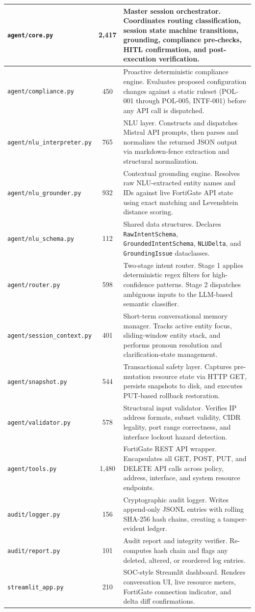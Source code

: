 \begin{longtable}{|l|c|p{7.5cm}|}
\texttt{agent/core.py} & 2,417 & Master session orchestrator. Coordinates routing classification, session state machine transitions, grounding, compliance pre-checks, HITL confirmation, and post-execution verification. \\ \hline
\texttt{agent/compliance.py} & 450 & Proactive deterministic compliance engine. Evaluates proposed configuration changes against a static ruleset (POL-001 through POL-005, INTF-001) before any API call is dispatched. \\ \hline
\texttt{agent/nlu\_interpreter.py} & 765 & NLU layer. Constructs and dispatches Mistral API prompts, then parses and normalizes the returned JSON output via markdown-fence extraction and structural normalization. \\ \hline
\texttt{agent/nlu\_grounder.py} & 932 & Contextual grounding engine. Resolves raw NLU-extracted entity names and IDs against live FortiGate API state using exact matching and Levenshtein distance scoring. \\ \hline
\texttt{agent/nlu\_schema.py} & 112 & Shared data structures. Declares \texttt{RawIntentSchema}, \texttt{GroundedIntentSchema}, \texttt{NLUDelta}, and \texttt{GroundingIssue} dataclasses. \\ \hline
\texttt{agent/router.py} & 598 & Two-stage intent router. Stage 1 applies deterministic regex filters for high-confidence patterns. Stage 2 dispatches ambiguous inputs to the LLM-based semantic classifier. \\ \hline
\texttt{agent/session\_context.py} & 401 & Short-term conversational memory manager. Tracks active entity focus, sliding-window entity stack, and performs pronoun resolution and clarification-state management. \\ \hline
\texttt{agent/snapshot.py} & 544 & Transactional safety layer. Captures pre-mutation resource state via HTTP GET, persists snapshots to disk, and executes PUT-based rollback restoration. \\ \hline
\texttt{agent/validator.py} & 578 & Structural input validator. Verifies IP address formats, subnet validity, CIDR legality, port range correctness, and interface lockout hazard detection. \\ \hline
\texttt{agent/tools.py} & 1,480 & FortiGate REST API wrapper. Encapsulates all GET, POST, PUT, and DELETE API calls across policy, address, interface, and system resource endpoints. \\ \hline
\texttt{audit/logger.py} & 156 & Cryptographic audit logger. Writes append-only JSONL entries with rolling SHA-256 hash chains, creating a tamper-evident ledger. \\ \hline
\texttt{audit/report.py} & 101 & Audit report and integrity verifier. Re-computes hash chain and flags any deleted, altered, or reordered log entries. \\ \hline
\texttt{streamlit\_app.py} & 210 & SOC-style Streamlit dashboard. Renders conversation UI, live resource meters, FortiGate connection indicator, and delta diff confirmations. \\ \hline
\end{longtable}


